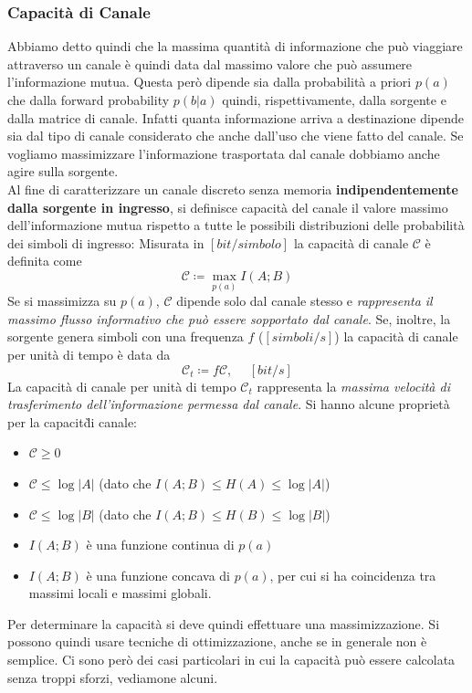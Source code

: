 \subsubsection{Capacit\`a di Canale}
Abbiamo detto quindi che la massima quantità di informazione che può viaggiare attraverso un canale è quindi data dal massimo valore che può assumere l'informazione mutua. Questa per\`o dipende sia dalla probabilit\`a a priori $p(a)$ che dalla forward probability $p(b|a)$ quindi, rispettivamente, dalla sorgente e dalla matrice di canale. Infatti quanta informazione arriva a destinazione dipende sia dal tipo di canale considerato che anche dall’uso che viene fatto del canale. Se vogliamo massimizzare l’informazione trasportata dal canale dobbiamo anche agire sulla sorgente. \\
Al fine di caratterizzare un canale discreto senza memoria \textbf{indipendentemente dalla sorgente in ingresso}, si definisce capacità del canale il valore massimo dell’informazione mutua rispetto a tutte le possibili distribuzioni delle probabilità dei simboli di ingresso:
 Misurata in $[bit/simbolo]$ la capacit\`a di canale $\mathcal{C}$ \`e  definita come
\begin{equation}
    \mathcal{C} \coloneqq \max_{p(a)} I(A;B)
\end{equation}
Se si massimizza su $p(a)$, $\mathcal{C}$ dipende solo dal canale stesso e \textit{rappresenta il massimo flusso informativo che può essere sopportato dal canale}. Se, inoltre, la sorgente genera simboli con una frequenza $f$ ($[simboli/s]$) la capacit\`a di canale per unit\`a di tempo \`e data da
\begin{equation}
    \mathcal{C}_t \coloneqq f \mathcal{C}, \hspace{15pt} [bit/s]
\end{equation}
La capacità di canale per unità di tempo $\mathcal{C}_t$ rappresenta la \textit{massima velocità di trasferimento dell’informazione permessa dal canale}. Si hanno alcune propriet\`a per la capacit\` di canale:
\begin{itemize}
    \item $\mathcal{C} \geq 0$
    \item $\mathcal{C} \leq \log |A|$ (dato che $I(A;B) \leq H(A) \leq \log |A|$)
    \item $\mathcal{C} \leq \log |B|$ (dato che $I(A;B) \leq H(B) \leq \log |B|$)
    \item $I(A;B)$ \`e una funzione continua di $p(a)$
    \item $I(A;B)$ \`e una funzione concava di $p(a)$, per cui si ha coincidenza tra massimi locali e massimi globali.
\end{itemize}
Per determinare la capacità si deve quindi effettuare una massimizzazione. Si possono quindi usare tecniche di ottimizzazione, anche se in generale non è semplice. Ci sono per\`o dei casi particolari in cui la capacità può essere calcolata senza troppi sforzi, vediamone alcuni.
